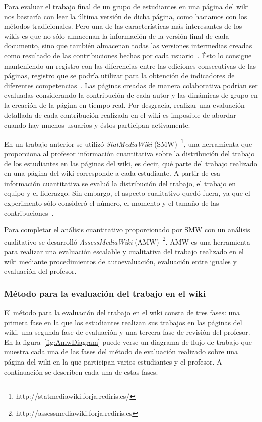 Para evaluar el trabajo final de un grupo de estudiantes en una página del wiki nos bastaría con leer la última versión de dicha página, como haciamos con los métodos tradicionales. Pero una de las características más interesantes de los wikis es que no sólo almacenan la información de la versión final de cada documento, sino que también almacenan todas las versiones intermedias creadas como resultado de las contribuciones hechas por cada usuario~\cite{trentin2009using}. Ésto lo consigue manteniendo un registro con las diferencias entre las ediciones consecutivas de las páginas, registro que se podría utilizar para la obtención de indicadores de diferentes competencias~\cite{ortega2011new}. Las páginas creadas de manera colaborativa podrían ser evaluadas considerando la contribución de cada autor y las dinámicas de grupo en la creación de la página en tiempo real. Por desgracia, realizar una evaluación detallada de cada contribución realizada en el wiki es imposible de abordar cuando hay muchos usuarios y éstos participan activamente.

En un trabajo anterior se utilizó \emph{StatMediaWiki} (SMW)~\footnote{http://statmediawiki.forja.rediris.es/}, una herramienta que proporciona al profesor información cuantitativa sobre la distribución del trabajo de los estudiantes en las páginas del wiki, es decir, qué parte del trabajo realizado en una página del wiki corresponde a cada estudiante. A partir de esa información cuantitativa se evaluó la distribución del trabajo, el trabajo en equipo y el liderazgo. Sin embargo, el aspecto cualitativo quedó fuera, ya que el experimento sólo consideró el número, el momento y el tamaño de las contribuciones~\cite{palomo2014assessment}.

Para completar el análisis cuantitativo proporcionado por SMW con un análisis cualitativo se desarrolló \emph{AssessMediaWiki} (AMW)~\footnote{http://assessmediawiki.forja.rediris.es}. AMW es una herramienta para realizar una evaluación escalable y cualitativa del trabajo realizado en el wiki mediante procedimientos de autoevaluación, evaluación entre iguales y evaluación del profesor.

\subsubsection{Método para la evaluación del trabajo en el wiki}

El método para la evaluación del trabajo en el wiki consta de tres fases: una primera fase en la que los estudiantes realizan sus trabajos en las páginas del wiki, una segunda fase de evaluación y una tercera fase de revisión del profesor. En la figura~\ref{fig:AmwDiagram} puede verse un diagrama de flujo de trabajo que muestra cada una de las fases del método de evaluación realizado sobre una página del wiki en la que participan varios estudiantes y el profesor. A continuación se describen cada una de estas fases.

